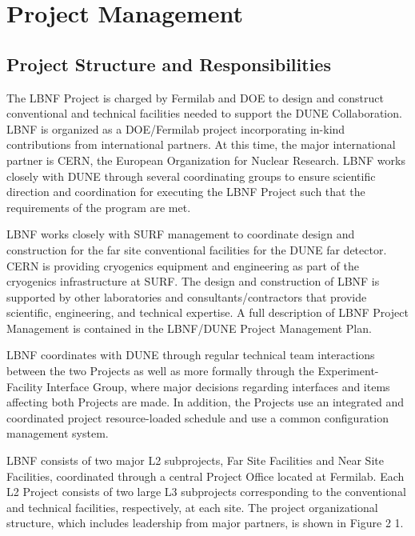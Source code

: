 \chapter{Project Management}
\label{ch:intro-pm}

\section{Project Structure and Responsibilities}

The LBNF Project is charged by Fermilab and DOE to design and construct conventional and technical facilities needed to support the DUNE Collaboration. LBNF is organized as a DOE/Fermilab project incorporating in-kind contributions from international partners. At this time, the major international partner is CERN, the European Organization for Nuclear Research. LBNF works closely with DUNE through several coordinating groups to ensure scientific direction and coordination for executing the LBNF Project such that the requirements of the program are met. 

LBNF works closely with SURF management to coordinate design and construction for the far site conventional facilities for the DUNE far detector. CERN is providing cryogenics equipment and engineering as part of the cryogenics infrastructure at SURF. The design and construction of LBNF is supported by other laboratories and consultants/contractors that provide scientific, engineering, and technical expertise.  A full description of LBNF Project Management is contained in the LBNF/DUNE Project Management Plan\cite{PMP-10770}.

LBNF coordinates with DUNE through regular technical team interactions between the two Projects as well as more formally through the Experiment-Facility Interface Group, where major decisions regarding interfaces and items affecting both Projects are made. In addition, the Projects use an integrated and coordinated project resource-loaded schedule and use a common configuration management system. 


 


LBNF consists of two major L2 subprojects, Far Site Facilities and Near Site Facilities, coordinated through a central Project Office located at Fermilab.  Each L2 Project consists of two large L3 subprojects corresponding to the conventional and technical facilities, respectively, at each site. The project organizational structure, which includes leadership from major partners, is shown in Figure 2 1.


